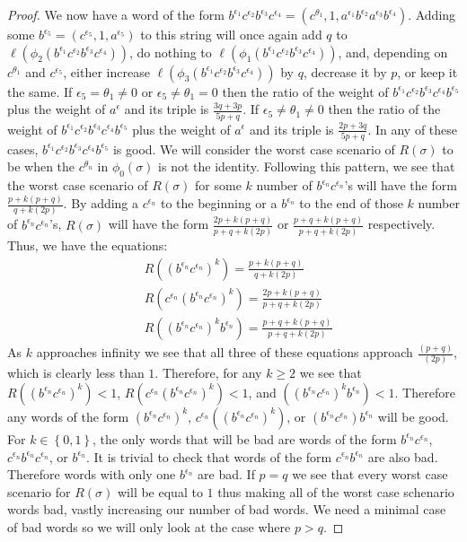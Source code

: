 \documentclass[11pt]{amsart}
\theoremstyle{definition}
\theoremstyle{remark}
\numberwithin{equation}{section}
\begin{document}
\begin{proof}
We now have a word of the form $b^{\epsilon_1}c^{\epsilon_2}b^{\epsilon_3}c^{\epsilon_4}=(c^{\theta_1},1,a^{\epsilon_1}b^{\epsilon_2}a^{\epsilon_3}b^{\epsilon_4})$.  Adding some $b^{\epsilon_5}=(c^{\epsilon_5},1,a^{\epsilon_5})$ to this string will once again add $q$ to $\ell(\phi_2(b^{\epsilon_1}c^{\epsilon_2}b^{\epsilon_3}c^{\epsilon_4}))$, do nothing to $\ell(\phi_1(b^{\epsilon_1}c^{\epsilon_2}b^{\epsilon_3}c^{\epsilon_4}))$, and, depending on $c^{\theta_1}$ and $c^{\epsilon_5}$, either increase $\ell(\phi_3(b^{\epsilon_1}c^{\epsilon_2}b^{\epsilon_3}c^{\epsilon_4}))$ by $q$, decrease it by $p$, or keep it the same. If $\epsilon_5=\theta_1\neq0$ or $\epsilon_5\neq\theta_1=0$ then the ratio of the weight of $b^{\epsilon_1}c^{\epsilon_2}b^{\epsilon_3}c^{\epsilon_4}b^{\epsilon_5}$ plus the weight of $a^{\epsilon}$ and its triple is $\frac{3q+3p}{5p+q}$. If $\epsilon_5\neq\theta_1\neq0$ then the ratio of the weight of $b^{\epsilon_1}c^{\epsilon_2}b^{\epsilon_3}c^{\epsilon_4}b^{\epsilon_5}$ plus the weight of $a^{\epsilon}$ and its triple is $\frac{2p+3q}{5p+q}$.  In any of these cases, $b^{\epsilon_1}c^{\epsilon_2}b^{\epsilon_3}c^{\epsilon_4}b^{\epsilon_5}$ is good.  We will consider the worst case scenario of $R(\sigma)$ to be when the $c^{\theta_n}$ in $\phi_0(\sigma)$ is not the identity.  Following this pattern, we see that the worst case scenario of $R(\sigma)$ for some $k$ number of $b^{\epsilon_n}c^{\epsilon_n}$'s will have the form $\frac{p+k(p+q)}{q+k(2p)}$. By adding a $c^{\epsilon_n}$ to the beginning or a $b^{\epsilon_n}$ to the end of those $k$ number of $b^{\epsilon_n}c^{\epsilon_n}$'s, $R(\sigma)$ will have the form $\frac{2p+k(p+q)}{p+q+k(2p)}$ or $\frac{p+q+k(p+q)}{p+q+k(2p)}$ respectively. Thus, we have the equations: 
\begin{align*}
& R((b^{\epsilon_n}c^{\epsilon_n})^k)=\frac{p+k(p+q)}{q+k(2p)}\\
& R(c^{\epsilon_n}(b^{\epsilon_n}c^{\epsilon_n})^k)=\frac{2p+k(p+q)}{p+q+k(2p)}\\
& R((b^{\epsilon_n}c^{\epsilon_n})^kb^{\epsilon_n})=\frac{p+q+k(p+q)}{p+q+k(2p)}
\end{align*}
As $k$ approaches infinity we see that all three of these equations approach $\frac{(p+q)}{(2p)}$, which is clearly less than $1$.  Therefore, for any $k\geq2$ we see that $R((b^{\epsilon_n}c^{\epsilon_n})^k)<1$, $R(c^{\epsilon_n}(b^{\epsilon_n}c^{\epsilon_n})^k)<1$, and $((b^{\epsilon_n}c^{\epsilon_n})^kb^{\epsilon_n})<1$.  Therefore any words of the form $(b^{\epsilon_n}c^{\epsilon_n})^k$, $c^{\epsilon_n}((b^{\epsilon_n}c^{\epsilon_n})^k)$, or $(b^{\epsilon_n}c^{\epsilon_n})b^{\epsilon_n}$ will be good.  For $k\in\left\{0,1\right\}$, the only words that will be bad are words of the form $b^{\epsilon_n}c^{\epsilon_n}$, $c^{\epsilon_n}b^{\epsilon_n}c^{\epsilon_n}$, or $b^{\epsilon_n}$.  It is trivial to check that words of the form $c^{\epsilon_n}b^{\epsilon_n}$ are also bad.  Therefore words with only one $b^{\epsilon_n}$ are bad. If $p=q$ we see that every worst case scenario for $R(\sigma)$ will be equal to $1$ thus making all of the worst case schenario words bad, vastly increasing our number of bad words.  We need a minimal case of bad words so we will only look at the case where $p>q$.
\end{proof}  
\end{document}
